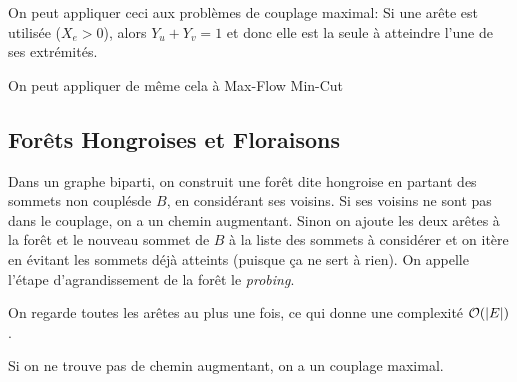 \documentclass[math, info]{cours}
\begin{document}
On peut appliquer ceci aux problèmes de couplage maximal:
Si une arête est utilisée ($X_{e} > 0$), alors $Y_{u} + Y_{v} = 1$ et donc elle est la seule à atteindre l'une de ses extrémités.

On peut appliquer de même cela à Max-Flow Min-Cut


\subsection{Forêts Hongroises et Floraisons}
\begin{definition}
	Dans un graphe biparti, on construit une forêt dite hongroise en partant des sommets non couplésde $B$, en considérant ses voisins.
	Si ses voisins ne sont pas dans le couplage, on a un chemin augmentant.
	Sinon on ajoute les deux arêtes à la forêt et le nouveau sommet de $B$ à la liste des sommets à considérer et on itère en évitant les sommets déjà atteints (puisque ça ne sert à rien).
	On appelle l'étape d'agrandissement de la forêt le \emph{probing}.
	\label{def:hungarianforest}
\end{definition}

On regarde toutes les arêtes au plus une fois, ce qui donne une complexité $\mathcal{O}(\left|E\right|)$.

\begin{proposition}
	Si on ne trouve pas de chemin augmentant, on a un couplage maximal.
	\label{prop:maxcouple}
\end{proposition}
\end{document}
